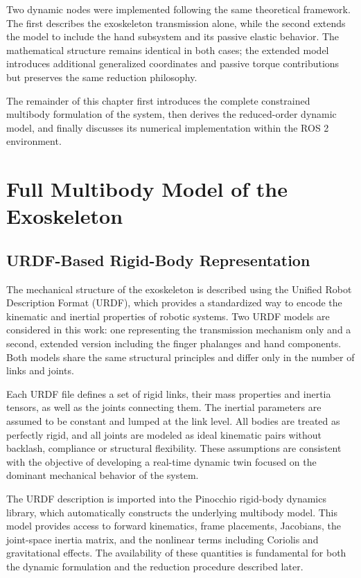 Two dynamic nodes were implemented following the same theoretical framework. The first describes the exoskeleton transmission alone, while the second extends the model to include the hand subsystem and its passive elastic behavior. The mathematical structure remains identical in both cases; the extended model introduces additional generalized coordinates and passive torque contributions but preserves the same reduction philosophy.

The remainder of this chapter first introduces the complete constrained multibody formulation of the system, then derives the reduced-order dynamic model, and finally discusses its numerical implementation within the ROS 2 environment.

\section{Full Multibody Model of the Exoskeleton}
\subsection{URDF-Based Rigid-Body Representation}
The mechanical structure of the exoskeleton is described using the Unified Robot Description Format (URDF), which provides a standardized way to encode the kinematic and inertial properties of robotic systems. Two URDF models are considered in this work: one representing the transmission mechanism only and a second, extended version including the finger phalanges and hand components. Both models share the same structural principles and differ only in the number of links and joints.

Each URDF file defines a set of rigid links, their mass properties and inertia tensors, as well as the joints connecting them. The inertial parameters are assumed to be constant and lumped at the link level. All bodies are treated as perfectly rigid, and all joints are modeled as ideal kinematic pairs without backlash, compliance or structural flexibility. These assumptions are consistent with the objective of developing a real-time dynamic twin focused on the dominant mechanical behavior of the system.

The URDF description is imported into the Pinocchio rigid-body dynamics library, which automatically constructs the underlying multibody model. This model provides access to forward kinematics, frame placements, Jacobians, the joint-space inertia matrix, and the nonlinear terms including Coriolis and gravitational effects. The availability of these quantities is fundamental for both the dynamic formulation and the reduction procedure described later.

